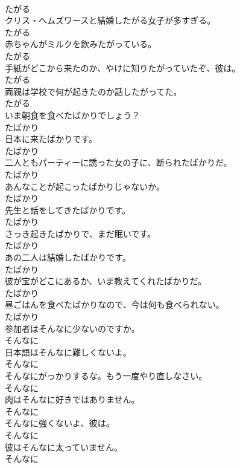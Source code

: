 \documentclass[8pt]{extreport}
\begin{document}
\begin{CJK}{UTF8}{min}
\\	たがる
\\	クリス・ヘムズワースと結婚したがる女子が多すぎる。	
\\	たがる
\\	赤ちゃんがミルクを飲みたがっている。	
\\	たがる
\\	手紙がどこから来たのか、やけに知りたがっていたぞ、彼は。	
\\	たがる
\\	両親は学校で何が起きたのか話したがってた。	
\\	たがる
\\	いま朝食を食べたばかりでしょう？	
\\	たばかり
\\	日本に来たばかりです。	
\\	たばかり
\\	二人ともパーティーに誘った女の子に、断られたばかりだ。	
\\	たばかり
\\	あんなことが起こったばかりじゃないか。	
\\	たばかり
\\	先生と話をしてきたばかりです。	
\\	たばかり
\\	さっき起きたばかりで、まだ眠いです。	
\\	たばかり
\\	あの二人は結婚したばかりです。	
\\	たばかり
\\	彼が宝がどこにあるか、いま教えてくれたばかりだ。	
\\	たばかり
\\	昼ごはんを食べたばかりなので、今は何も食べられない。	
\\	たばかり
\\	参加者はそんなに少ないのですか。	
\\	そんなに
\\	日本語はそんなに難しくないよ。	
\\	そんなに
\\	そんなにがっかりするな。もう一度やり直しなさい。	
\\	そんなに
\\	肉はそんなに好きではありません。	
\\	そんなに
\\	そんなに強くないよ、彼は。	
\\	そんなに
\\	彼はそんなに太っていません。	
\\	そんなに

\end{CJK}
\end{document}
